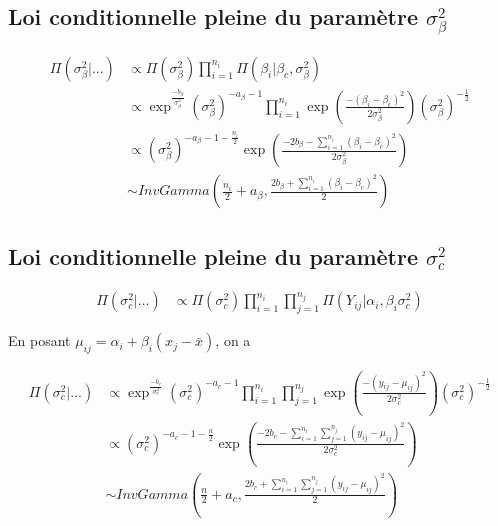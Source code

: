 \documentclass[
]{article}
\begin{document}
\hypertarget{loi-conditionnelle-pleine-du-paramuxe8tre-sigma_beta2}{%
\subsection{\texorpdfstring{Loi conditionnelle pleine du paramètre
\(\sigma_{\beta}^2\)}{Loi conditionnelle pleine du paramètre \textbackslash sigma\_\{\textbackslash beta\}\^{}2}}\label{loi-conditionnelle-pleine-du-paramuxe8tre-sigma_beta2}}

\begin{align*}
\Pi(\sigma_{\beta}^{2}|...) &\propto \Pi(\sigma_{\beta}^{2}) \prod_{i=1}^{n_{i}}\Pi(\beta_{i}|\beta_{c},\sigma_{\beta}^{2}) \\
&\propto \exp^{\frac{-b_{\beta}}{\sigma_{\beta}^{2}}}(\sigma_{\beta}^{2})^{-a_{\beta}-1}\prod_{i=1}^{n_{i}} \exp\left(\frac{-(\beta_{i}-\beta_{c})^{2}}{2\sigma_{\beta}^{2}}\right)(\sigma_{\beta}^{2})^{-\frac{1}{2}}\\
&\propto (\sigma_{\beta}^{2})^{-a_{\beta}-1-\frac{n_{i}}{2}}\exp\left(\frac{-2b_{\beta}-\sum\limits_{i=1}^{n_{i}}(\beta_{i}-\beta_{c})^{2}}{2\sigma_{\beta}^{2}}\right)\\
&\sim InvGamma(\frac{n_{i}}{2}+a_{\beta},\frac{2b_{\beta}+\sum\limits_{i=1}^{n_{i}}(\beta_{i}-\beta_{c})^{2}}{2})
\end{align*}

\hypertarget{loi-conditionnelle-pleine-du-paramuxe8tre-sigma_c2}{%
\subsection{\texorpdfstring{Loi conditionnelle pleine du paramètre
\(\sigma_{c}^2\)}{Loi conditionnelle pleine du paramètre \textbackslash sigma\_\{c\}\^{}2}}\label{loi-conditionnelle-pleine-du-paramuxe8tre-sigma_c2}}

\begin{align*}
\Pi(\sigma_c^2|...) &\propto \Pi(\sigma_c^2) \prod_{i=1}^{n_i}\prod_{j=1}^{n_j}\Pi(Y_{ij}|\alpha_{i},\beta_{i} \sigma_c^2)
\end{align*}

En posant \(\mu_{ij} = \alpha_i + \beta_i(x_j-\bar{x})\), on a

\begin{align*}
\Pi(\sigma_c^2|...) &\propto \exp^{\frac{-b_c}{\sigma_c^2}}(\sigma_c^2)^{-a_c-1}\prod_{i=1}^{n_i}\prod_{j=1}^{n_j} \exp\left(\frac{-(y_{ij}-\mu_{ij})^{2}}{2\sigma_c^2}\right)(\sigma_c^2)^{-\frac{1}{2}}\\
&\propto (\sigma_c^2)^{-a_c-1-\frac{n}{2}}\exp\left(\frac{-2b_c-\sum\limits_{i=1}^{n_i}\sum\limits_{j=1}^{n_j}(y_{ij}-\mu_{ij})^{2}}{2\sigma_c^2}\right)\\
&\sim InvGamma(\frac{n}{2}+a_c,\frac{2b_c+\sum\limits_{i=1}^{n_i}\sum\limits_{j=1}^{n_j}(y_{ij}-\mu_{ij})^{2}}{2})
\end{align*}
\end{document}
